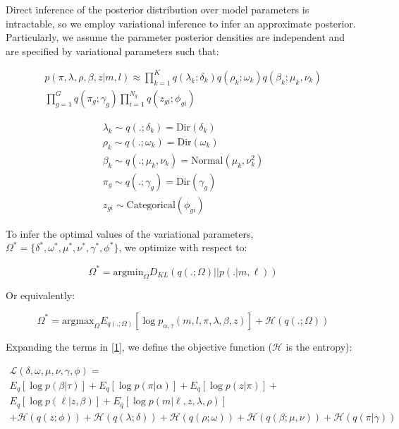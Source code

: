 \documentclass{article}
\newcommand{\Lagr}{\mathcal{L}}
\begin{document}
Direct inference of the posterior distribution over model parameters is intractable, so we employ variational inference to infer an approximate posterior. Particularly,
we assume the parameter posterior densities are independent and are specified by variational parameters such that:

\begin{align}
p(\pi,\lambda,\rho,\beta,z | m, l) \approx \prod_{k=1}^K q(\lambda_k; \delta_k)q(\rho_k; \omega_k)q(\beta_k; \mu_k, \nu_k) \\
	\prod_{g=1}^G q(\pi_g; \gamma_g) \prod_{i=1}^{N_g} q(z_{gi};\phi_{gi})
\end{align}

\begin{align*}
\lambda_k \sim q(.;\delta_k) = \textrm{Dir}(\delta_k) \\
	\rho_k \sim q(.;\omega_k) = \textrm{Dir}(\omega_k) \\
	\beta_k \sim q(.;\mu_k, \nu_k) = \textrm{Normal}(\mu_k, \nu_k^2) \\
	\pi_g \sim q(.;\gamma_g) = \textrm{Dir}(\gamma_g) \\
	z_{gi} \sim \textrm{Categorical}(\phi_{gi})
\end{align*}

To infer the optimal values of the variational parameters, $\Omega^* = \{\delta^*, \omega^*, \mu^*, \nu^*, \gamma^*, \phi^*\}$, we optimize with respect to:

\begin{equation}
\Omega^* = \mathrm{argmin}_{\Omega} D_{KL}( q(.;\Omega) || p(.| m, \ell) )
\end{equation}

Or equivalently:

\begin{equation} \label{1}
\Omega^* = \mathrm{argmax}_{\Omega} E_{q(.;\Omega)}[\log p_{\alpha,\tau}(m,l, \pi, \lambda, \beta, z)] + \mathcal{H}(q(.;\Omega))
\end{equation}

Expanding the terms in \eqref{1}, we define the objective function ($\mathcal{H}$ is the entropy):

\begin{equation} \label{L}
\begin{split}
\Lagr(\delta, \omega, \mu, \nu, \gamma, \phi) = \\
	E_q [\log p(\beta | \tau)] + E_q [\log{p(\pi | \alpha)}] +  E_q [\log{p(z | \pi )}] + \\
	E_q [\log{p(\ell | z, \beta)}] + E_q [\log{p(m | \ell, z, \lambda, \rho)}] \\
	+ \mathcal{H}(q(z;\phi)) + \mathcal{H}(q(\lambda;\delta)) + \mathcal{H}(q(\rho;\omega)) + \mathcal{H}(q(\beta;\mu, \nu)) + \mathcal{H}(q(\pi|\gamma)) 
\end{split}
\end{equation}
\end{document}
